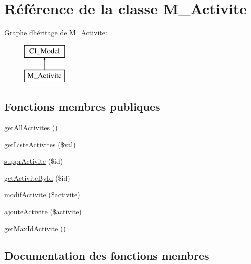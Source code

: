 \hypertarget{class_m___activite}{}\section{Référence de la classe M\+\_\+\+Activite}
\label{class_m___activite}
Graphe d\textquotesingle{}héritage de M\+\_\+\+Activite\+:\begin{figure}[H]
\begin{center}
\leavevmode
\includegraphics[height=2.000000cm]{class_m___activite}
\end{center}
\end{figure}
\subsection*{Fonctions membres publiques}
\begin{DoxyCompactItemize}
\item 
\hyperlink{class_m___activite_ab048497e24a4b97c4c06744136f9c191}{get\+All\+Activites} ()
\item 
\hyperlink{class_m___activite_a50c113f3a0a372c0d18c8aa020ac723d}{get\+Liste\+Activites} (\$val)
\item 
\hyperlink{class_m___activite_a17bbfdd0eeeccacb29073d2a76228bc3}{suppr\+Activite} (\$id)
\item 
\hyperlink{class_m___activite_ade611581b7f071fe2e9aa80b02fa816c}{get\+Activite\+By\+Id} (\$id)
\item 
\hyperlink{class_m___activite_a0499c8619fc39c3eb13f9b91ef37e885}{modif\+Activite} (\$activite)
\item 
\hyperlink{class_m___activite_a63fc2dc402b2c52c57c0941fae4298c5}{ajoute\+Activite} (\$activite)
\item 
\hyperlink{class_m___activite_a5b7297e0704792288f9163c93ebb961a}{get\+Max\+Id\+Activite} ()
\end{DoxyCompactItemize}


\subsection{Documentation des fonctions membres}
\mbox{\label{class_m___activite_a63fc2dc402b2c52c57c0941fae4298c5}} 
